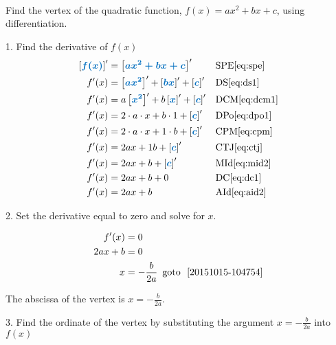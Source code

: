 \documentclass[20150903-160354-rs2.2-MarksMathNotebook.tex]{subfiles}
\begin{document}
\begin{example}[id:20151008-110208] \label{20151008-110208} \hfill \\
Find the vertex of the quadratic function, $f(x)=ax^2+bx+c$, using differentiation.

\soln

\solnsteps

1. Find the derivative of $f(x)$
\begin{align*}
\farg{f(x)}' &= \farg{ax^2+bx+c}' && \text{SPE} \eqref{eq:spe} \\
f'(x) &= \farg{ax^2}' + \farg{bx}' + \farg{c}' && \text{DS} \eqref{eq:ds1} \\
f'(x) &= a\farg{x^2}' + b \farg{x}' + \farg{c}' && \text{DCM} \eqref{eq:dcm1} \\
f'(x) &= 2 \cdot a \cdot{x} + b \cdot 1 + \farg{c}' && \text{DPo} \eqref{eq:dpo1} \\
f'(x) &= 2 \cdot a \cdot{x} + 1 \cdot b + \farg{c}' && \text{CPM} \eqref{eq:cpm} \\
f'(x) &= 2ax + 1b+ \farg{c}' && \text{CTJ} \eqref{eq:ctj} \\
f'(x) &= 2ax + b + \farg{c}' && \text{MId} \eqref{eq:mid2} \\
f'(x) &= 2ax + b + 0 && \text{DC} \eqref{eq:dc1} \\
f'(x) &= 2ax + b && \text{AId} \eqref{eq:aid2} \\
\end{align*}

2. Set the derivative equal to zero and solve for $x$.

\begin{align*}
f'(x) & = 0 \\
2ax + b &= 0  \\
x &= -\frac{b}{2a}  \text{\, goto \,} \, \ref{20151015-104754}
\end{align*}

The abscissa of the vertex is $x=-\frac{b}{2a}$.

3.  Find the ordinate of the vertex by substituting the argument $x=-\frac{b}{2a}$ into $f(x)$

\end{example}
\end{document}
